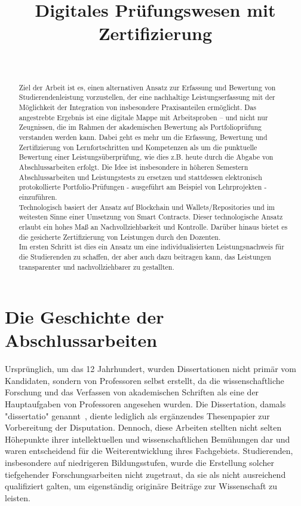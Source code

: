 \documentclass[conference]{IEEEtran}
\title{Digitales Prüfungswesen mit Zertifizierung}
\author{
    \IEEEauthorblockN{Martin Becke\IEEEauthorrefmark{1}\textsuperscript{\textdagger}, Julia Padberg\IEEEauthorrefmark{1}\textsuperscript{\textasteriskcentered}}\\
    \IEEEauthorblockA{\IEEEauthorrefmark{1} NahLab! HAW Hamburg\\
    \textsuperscript{\textdagger}Martin.Becke@haw-hamburg.de, \textsuperscript{\textasteriskcentered}Julia.Padberg@haw-hamburg.de}
}
\date{}
\begin{document}
\maketitle

\begin{abstract}
Ziel der Arbeit ist es, einen alternativen Ansatz zur Erfassung und Bewertung von Studierendenleistung vorzustellen, der eine nachhaltige Leistungserfassung mit der Möglichkeit der Integration von insbesondere Praxisanteilen ermöglicht. Das angestrebte Ergebnis ist eine digitale Mappe mit Arbeitsproben -- und nicht nur Zeugnissen, die im Rahmen der akademischen Bewertung als Portfolioprüfung verstanden werden kann. Dabei geht es mehr um die Erfassung, Bewertung und Zertifizierung von Lernfortschritten und Kompetenzen als um die punktuelle Bewertung einer Leistungsüberprüfung, wie dies  z.B. heute durch die Abgabe von Abschlussarbeiten erfolgt. 
Die Idee ist insbesondere in höheren Semestern Abschlussarbeiten und Leistungstests zu ersetzen und stattdessen elektronisch protokollierte Portfolio-Prüfungen - ausgeführt am Beispiel von Lehrprojekten - einzuführen.
\\
Technologisch basiert der Ansatz auf Blockchain und Wallets/Repositories und im weitesten Sinne einer Umsetzung von Smart Contracts. Dieser technologische Ansatz erlaubt ein hohes Maß an Nachvollziehbarkeit und Kontrolle. Darüber hinaus bietet es die gesicherte Zertifizierung von Leistungen durch den Dozenten. 
\\
Im ersten Schritt ist dies ein Ansatz um eine individualisierten Leistungsnachweis für die Studierenden zu schaffen, der aber auch dazu beitragen kann, das Leistungen transparenter und nachvollziehbarer zu gestallten.
\end{abstract}

\section{Die Geschichte der Abschlussarbeiten}

Ursprünglich, um das 12 Jahrhundert, wurden Dissertationen nicht primär vom Kandidaten, sondern von Professoren selbst erstellt, da die wissenschaftliche Forschung und das Verfassen von akademischen Schriften als eine der Hauptaufgaben von Professoren angesehen wurden. Die Dissertation, damals "dissertatio" genannt~\cite{Blair}, diente lediglich als ergänzendes Thesenpapier zur Vorbereitung der Disputation. Dennoch, diese Arbeiten stellten nicht selten Höhepunkte ihrer intellektuellen und wissenschaftlichen Bemühungen dar und waren entscheidend für die Weiterentwicklung ihres Fachgebiets. Studierenden, insbesondere auf niedrigeren Bildungsstufen, wurde die Erstellung solcher tiefgehender Forschungsarbeiten nicht zugetraut, da sie als nicht ausreichend qualifiziert galten, um eigenständig originäre Beiträge zur Wissenschaft zu leisten.~\cite{Schmidt-Kunsemuller1979-vd}
\end{document}
